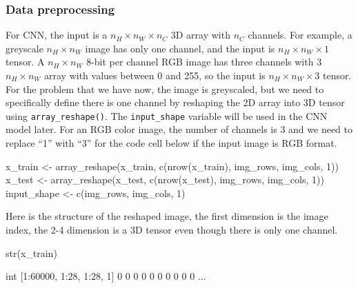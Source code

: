 \documentclass[
  12pt,
]{krantz}
\makeatletter
\newenvironment{Shaded}{\begin{snugshade}}{\end{snugshade}}
\newcommand{\DecValTok}[1]{\textcolor[rgb]{0.06,0.06,0.06}{#1}}
\newcommand{\FunctionTok}[1]{\textcolor[rgb]{0,0,0}{#1}}
\newcommand{\NormalTok}[1]{#1}
\newcommand{\OtherTok}[1]{\textcolor[rgb]{0.37,0.37,0.37}{#1}}
\newenvironment{kframe}{%
\medskip{}
\setlength{\fboxsep}{.8em}
 \def\at@end@of@kframe{}%
 \ifinner\ifhmode%
  \def\at@end@of@kframe{\end{minipage}}%
  \begin{minipage}{\columnwidth}%
 \fi\fi%
 \def\FrameCommand##1{\hskip\@totalleftmargin \hskip-\fboxsep
 \colorbox{shadecolor}{##1}\hskip-\fboxsep
     \hskip-\linewidth \hskip-\@totalleftmargin \hskip\columnwidth}%
 \MakeFramed {\advance\hsize-\width
   \@totalleftmargin\z@ \linewidth\hsize
   \@setminipage}}%
 {\par\unskip\endMakeFramed%
 \at@end@of@kframe}
\renewenvironment{Shaded}{\begin{kframe}}{\end{kframe}}
\makeatother
\begin{document}
\hypertarget{data-preprocessing-1}{%
\subsubsection{Data preprocessing}\label{data-preprocessing-1}}

For CNN, the input is a \(n_H \times n_W \times n_C\) 3D array with \(n_C\) channels. For example, a greyscale \(n_H \times n_W\) image has only one channel, and the input is \(n_H \times n_W \times 1\) tensor. A \(n_H \times n_W\) 8-bit per channel RGB image has three channels with 3 \(n_H \times n_W\) array with values between 0 and 255, so the input is \(n_H \times n_W \times 3\) tensor. For the problem that we have now, the image is greyscaled, but we need to specifically define there is one channel by reshaping the 2D array into 3D tensor using \texttt{array\_reshape()}. The \texttt{input\_shape} variable will be used in the CNN model later. For an RGB color image, the number of channels is 3 and we need to replace ``1'' with ``3'' for the code cell below if the input image is RGB format.

\begin{Shaded}
\begin{Highlighting}[]
\NormalTok{x\_train }\OtherTok{\textless{}{-}} \FunctionTok{array\_reshape}\NormalTok{(x\_train,}
                         \FunctionTok{c}\NormalTok{(}\FunctionTok{nrow}\NormalTok{(x\_train), img\_rows, img\_cols, }\DecValTok{1}\NormalTok{))}
\NormalTok{x\_test }\OtherTok{\textless{}{-}} \FunctionTok{array\_reshape}\NormalTok{(x\_test,}
                         \FunctionTok{c}\NormalTok{(}\FunctionTok{nrow}\NormalTok{(x\_test), img\_rows, img\_cols, }\DecValTok{1}\NormalTok{))}
\NormalTok{input\_shape }\OtherTok{\textless{}{-}} \FunctionTok{c}\NormalTok{(img\_rows, img\_cols, }\DecValTok{1}\NormalTok{)}
\end{Highlighting}
\end{Shaded}

Here is the structure of the reshaped image, the first dimension is the image index, the 2-4 dimension is a 3D tensor even though there is only one channel.

\begin{Shaded}
\begin{Highlighting}[]
\FunctionTok{str}\NormalTok{(x\_train)}
\end{Highlighting}
\end{Shaded}

\begin{Shaded}
\begin{Highlighting}[]
\NormalTok{int [1:60000, 1:28, 1:28, 1] 0 0 0 0 0 0 0 0 0 0 ...}
\end{Highlighting}
\end{Shaded}
\end{document}
